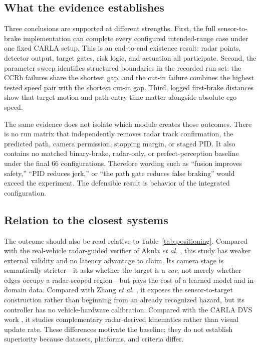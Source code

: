 \documentclass[conference]{IEEEtran}
\begin{document}
\subsection{What the evidence establishes}
Three conclusions are supported at different strengths. First, the full
sensor-to-brake implementation can complete every configured intended-range case
under one fixed CARLA setup. This is an end-to-end existence result: radar
points, detector output, target gates, risk logic, and actuation all participate.
Second, the parameter sweep identifies structured boundaries in the recorded
run set: the CCRb failures share the shortest gap, and the cut-in
failure combines the highest tested speed pair with the shortest cut-in gap.
Third, logged first-brake distances show that target motion and path-entry time
matter alongside absolute ego speed.

The same evidence does not isolate which module creates those outcomes. There is
no run matrix that independently removes radar track confirmation, the predicted
path, camera permission, stopping margin, or staged PID. It also contains no
matched binary-brake, radar-only, or perfect-perception baseline under the final
66 configurations. Therefore wording such as ``fusion improves safety,'' ``PID
reduces jerk,'' or ``the path gate reduces false braking'' would exceed the
experiment. The defensible result is behavior of the integrated configuration.

\subsection{Relation to the closest systems}
The outcome should also be read relative to Table~\ref{tab:positioning}. Compared
with the real-vehicle radar-guided verifier of Akula \emph{et al.}
\cite{akula2026radarguided}, this study has weaker external validity and no
latency advantage to claim. Its camera stage is semantically stricter---it asks
whether the target is a \emph{car}, not merely whether edges occupy a
radar-scoped region---but pays the cost of a learned model and in-domain data.
Compared with Zhang \emph{et al.} \cite{zhang2023curved}, it exposes the
sensor-to-target construction rather than beginning from an already recognized
hazard, but its controller has no vehicle-hardware calibration. Compared with
the CARLA DVS work \cite{feng2025dvs}, it studies complementary radar-derived
kinematics rather than visual update rate. These differences motivate the
baseline; they do not establish superiority because datasets, platforms, and
criteria differ.
\end{document}
